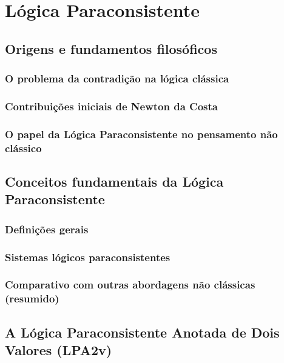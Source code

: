 
\chapter{Lógica Paraconsistente}
\label{cap:logica-paraconsistente}

\section{Origens e fundamentos filosóficos}
\subsection{O problema da contradição na lógica clássica}
\subsection{Contribuições iniciais de Newton da Costa}
\subsection{O papel da Lógica Paraconsistente no pensamento não clássico}

\section{Conceitos fundamentais da Lógica Paraconsistente}
\subsection{Definições gerais}
\subsection{Sistemas lógicos paraconsistentes}
\subsection{Comparativo com outras abordagens não clássicas (resumido)}

\section{A Lógica Paraconsistente Anotada de Dois Valores (LPA2v)}
